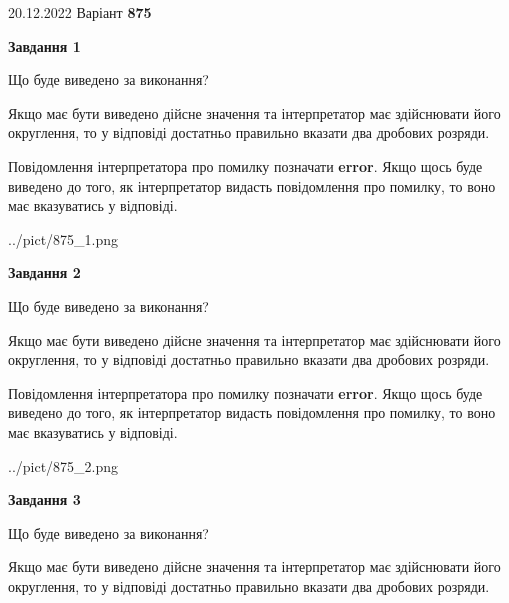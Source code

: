 \documentclass[12pt, ukrainian]{article}
\begin{document}
{20.12.2022 Варіант \No \textbf { 875 }\par}
{
\begin {Large}

{\begin {center}\textbf{Завдання 1}\end {center}}\par
Що буде виведено за виконання? \par

Якщо має бути виведено дійсне значення та інтерпретатор має здійснювати його округлення, 
то у відповіді достатньо правильно вказати два дробових розряди.

Повідомлення інтерпретатора про помилку позначати \textbf{error}.
Якщо щось буде виведено до того, як інтерпретатор видасть повідомлення про помилку, 
то воно має вказуватись у відповіді. \par

\begin{center}
	{../pict/875_1.png}
\end{center}
\newpage

{\begin {center}\textbf{Завдання 2}\end {center}}\par
Що буде виведено за виконання? \par

Якщо має бути виведено дійсне значення та інтерпретатор має здійснювати його округлення, 
то у відповіді достатньо правильно вказати два дробових розряди.

Повідомлення інтерпретатора про помилку позначати \textbf{error}.
Якщо щось буде виведено до того, як інтерпретатор видасть повідомлення про помилку, 
то воно має вказуватись у відповіді. \par

\begin{center}
	{../pict/875_2.png}
\end{center}
\newpage

{\begin {center}\textbf{Завдання 3}\end {center}}\par
Що буде виведено за виконання? \par

Якщо має бути виведено дійсне значення та інтерпретатор має здійснювати його округлення, 
то у відповіді достатньо правильно вказати два дробових розряди.


\end{Large}}
\end{document}
